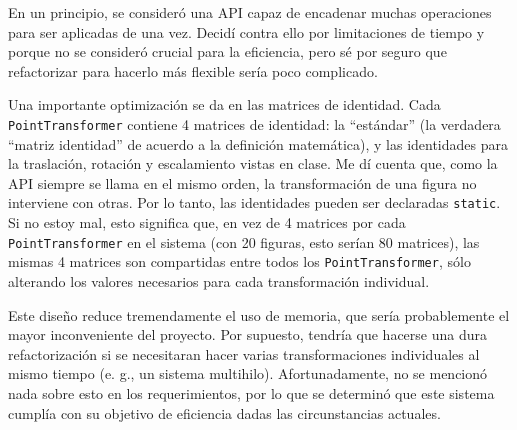 En un principio, se consideró una API capaz de encadenar muchas operaciones para ser
aplicadas de una vez. Decidí contra ello por limitaciones de tiempo y porque no se
consideró crucial para la eficiencia, pero sé por
seguro que refactorizar para hacerlo más flexible sería poco complicado.

Una importante optimización se da en las matrices de identidad. Cada \lstinline!PointTransformer!
contiene 4 matrices de identidad: la ``estándar'' (la verdadera
``matriz identidad'' de acuerdo a la definición matemática), y las identidades para
la traslación, rotación	y escalamiento vistas en clase. Me dí cuenta que, como la
API siempre se llama en el mismo orden, la transformación de una figura no interviene
con otras. Por lo tanto, las identidades pueden ser declaradas \lstinline!static!.
Si no estoy mal, esto significa que, en vez de 4 matrices por cada \lstinline!PointTransformer!
en el sistema (con 20 figuras, esto serían 80 matrices), las mismas 4 matrices
son compartidas entre todos los \lstinline!PointTransformer!, sólo alterando
los valores necesarios para cada transformación individual.

Este diseño reduce tremendamente el uso de memoria, que sería probablemente el
mayor inconveniente del proyecto. Por supuesto, tendría que hacerse una dura refactorización
si se necesitaran hacer varias transformaciones individuales al mismo tiempo (e. g.,
un sistema multihilo). Afortunadamente, no se mencionó nada sobre esto en los requerimientos,
por lo que se determinó que este sistema cumplía con su objetivo de eficiencia dadas
las circunstancias actuales.